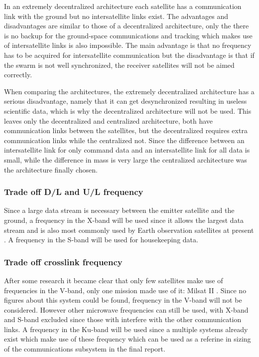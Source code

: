 In an extremely decentralized architecture each satellite has a communication link with the ground but no intersatellite links exist.
The advantages and disadvantages are similar to those of a decentralized architecture, only the there is no backup for the ground-space communications and tracking which makes use of intersatellite links is also impossible.
The main advantage is that no frequency has to be acquired for intersatellite communication but the disadvantage is that if the swarm is not well synchronized, the receiver satellites will not be aimed correctly.

When comparing the architectures, the extremely decentralized architecture has a serious disadvantage, namely that it can get desynchronized resulting in useless scientific data, which is why the decentralized architecture will not be used.
This leaves only the decentralized and centralized architecture, both have communication links between the satellites, but the decentralized requires extra communication links while the centralized not. Since the difference between an intersatellite link for only command data and an intersatellite link for all data is small, while the difference in mass is very large the centralized architecture was the architecture finally chosen.

\subsubsection{Trade off D/L and U/L frequency}
Since a large data stream is necessary between the emitter satellite and the ground, a frequency in the X-band will be used since it allows the largest data stream and is also most commonly used by Earth observation satellites at present \cite{icesattech} \cite{landsatcom}. A frequency in the S-band will be used for housekeeping data.

\subsubsection{Trade off crosslink frequency}
After some research it became clear that only few satellites make use of frequencies in the V-band, only one mission made use of it: Milsat II \cite{milstar}. Since no figures about this system could be found, frequency in the V-band will not be considered.
However other microwave frequencies can still be used, with X-band and S-band excluded since those with interfere with the other communication links. A frequency in the Ku-band will be used since a multiple systems already exist which make use of these frequency which can be used as a referine in sizing of the communications subsystem in the final report.

